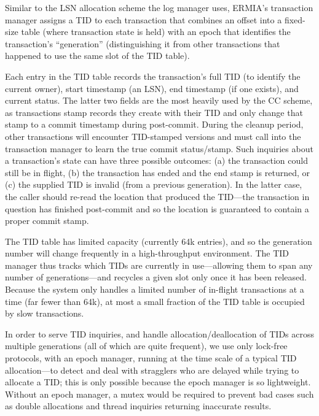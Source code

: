 Similar to the LSN allocation scheme the log manager uses, ERMIA's transaction manager assigns a TID to each transaction that combines an offset into a fixed-size table (where transaction state is held) with an epoch that identifies the transaction's ``generation'' (distinguishing it from other transactions that happened to use the same slot of the TID table).

Each entry in the TID table records the transaction's full TID (to identify the current owner), start timestamp (an LSN), end timestamp (if one exists), and current status. The latter two fields are the most heavily used by the CC scheme, as transactions stamp records they create with their TID and only change that stamp to a commit timestamp during post-commit. During the cleanup period, other transactions will encounter TID-stamped versions and must call into the transaction manager to learn the true commit status/stamp. Such inquiries about a transaction's state can have three possible outcomes: (a) the transaction could still be in flight, (b) the transaction has ended and the end stamp is returned, or (c) the supplied TID is invalid (from a previous generation). In the latter case, the caller should re-read the location that produced the TID---the transaction in question has finished post-commit and so the location is guaranteed to contain a proper commit stamp.

The TID table has limited capacity (currently 64k entries), and so the generation number will change frequently in a high-throughput environment. The TID manager thus tracks which TIDs are currently in use---allowing them to span any number of generations---and recycles a given slot only once it has been released. Because the system only handles a limited number of in-flight transactions at a time (far fewer than 64k), at most a small fraction of the TID table is occupied by slow transactions. 

In order to serve TID inquiries, and handle allocation/deallocation of TIDs across multiple generations (all of which are quite frequent), we use only lock-free protocols, with an epoch manager, running at the time scale of a typical TID allocation---to detect and deal with stragglers who are delayed while trying to allocate a TID; this is only possible because the epoch manager is so lightweight. Without an epoch manager, a mutex would be required to prevent bad cases such as double allocations and thread inquiries returning inaccurate results.

